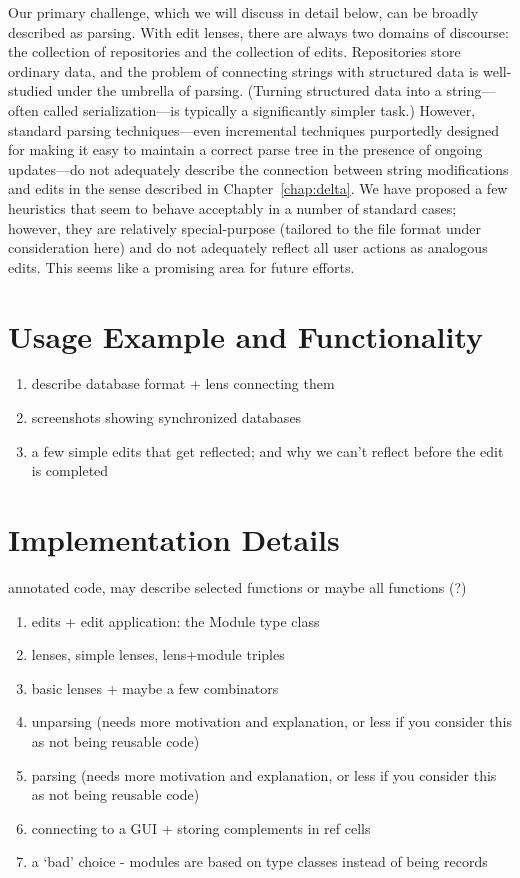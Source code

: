 Our primary challenge, which we will discuss in detail below, can be broadly
described as parsing. With edit lenses, there are always two domains of
discourse: the collection of repositories and the collection of edits.
Repositories store ordinary data, and the problem of connecting strings with
structured data is well-studied under the umbrella of parsing. (Turning
structured data into a string---often called serialization---is typically a
significantly simpler task.) However, standard parsing techniques---even
incremental techniques purportedly designed for making it easy to maintain a
correct parse tree in the presence of ongoing updates---do not adequately
describe the connection between string modifications and edits in the sense
described in Chapter~\ref{chap:delta}. We have proposed a few heuristics
that seem to behave acceptably in a number of standard cases; however, they
are relatively special-purpose (tailored to the file format under
consideration here) and do not adequately reflect all user actions as
analogous edits. This seems like a promising area for future efforts.

\section{Usage Example and Functionality}
\label{sec:impl-usage}
\begin{enumerate}
    \item describe database format + lens connecting them
    \item screenshots showing synchronized databases
    \item a few simple edits that get reflected; and why we can't reflect before the edit is completed
\end{enumerate}

\section{Implementation Details}
\label{sec:impl-details}
annotated code, may describe selected functions or maybe all functions (?)
\begin{enumerate}
    \item edits + edit application: the Module type class
    \item lenses, simple lenses, lens+module triples
    \item basic lenses + maybe a few combinators
    \item unparsing (needs more motivation and explanation, or less if you consider this as not being reusable code)
    \item parsing (needs more motivation and explanation, or less if you consider this as not being reusable code)
    \item connecting to a GUI + storing complements in ref cells
    \item a `bad' choice - modules are based on type classes instead of being records
\end{enumerate}


